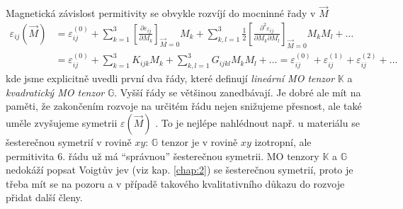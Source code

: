 Magnetická závislost permitivity se obvykle rozvíjí do mocninné řady v $\vec{M}$ \cite{visnovskyOpticsMagneticMultilayers2018}
\begin{equation} 
\label{eqn:MO-tenzory}
\begin{split}
    \varepsilon_{ij}(\vec{M})&=\varepsilon^{(0)}_{ij}
        + \sum_{k=1}^{3}\left[ \frac{\partial \varepsilon_{ij}}{\partial M_k}\right]_{\vec{M}=0} M_k 
        + \sum_{k,l=1}^{3} \frac{1}{2}\left[ \frac{\partial^2 \varepsilon_{ij}}{\partial M_k \partial M_l}\right]_{\vec{M}=0} M_k M_l + \dots 
    \\ &=\varepsilon^{(0)}_{ij} 
        + \sum_{k=1}^{3}K_{ijk} M_k 
        + \sum_{k,l=1}^{3} G_{ijkl} M_k M_l + \dots
        =\varepsilon^{(0)}_{ij} +\varepsilon^{(1)}_{ij} +\varepsilon^{(2)}_{ij} + \dots
\end{split}
\end{equation}
kde jsme explicitně uvedli první dva řády, které definují \emph{lineární MO tenzor} $\mathbb{K}$ a \emph{kvadratický MO tenzor} $\mathbb{G}$.
Vyšší řády se většinou zanedbávají.
Je dobré ale mít na paměti, že zakončením rozvoje na určitém řádu nejen snižujeme přesnost, ale také uměle zvyšujeme symetrii $\varepsilon(\vec{M})$ \cite{silberQuadraticMagnetoopticKerr2019a}.
To je nejlépe nahlédnout např. u materiálu se šesterečnou symetrií v rovině $xy$: $\mathbb{G}$ tenzor je v rovině $xy$ izotropní, ale permitivita 6. řádu už má ``správnou'' šesterečnou symetrii.
MO tenzory $\mathbb{K}$ a $\mathbb{G}$ nedokáží popsat Voigtův jev (viz kap. \ref{chap:2}) se šesterečnou symetrií, proto je třeba mít se na pozoru a v případě takového kvalitativního důkazu do rozvoje přidat další členy.

